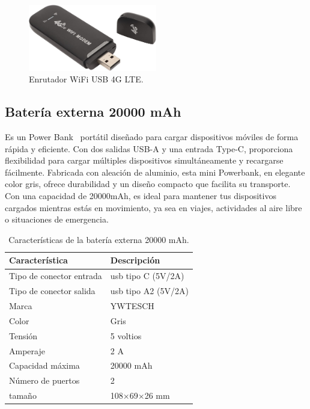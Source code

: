\begin{figure}[h]
    \centering
    \includegraphics[width=0.5\textwidth]{img/herramientas/enrutador_wifi.png}
    \caption{Enrutador WiFi USB 4G LTE.} \label{Img:EnrutadorWifi}
\end{figure}

\subsection{Batería externa 20000 mAh}
Es un Power Bank~\cite{misc:Powerbank} portátil diseñado para cargar dispositivos móviles de forma rápida y eficiente. Con dos salidas USB-A y una entrada Type-C, proporciona flexibilidad para cargar múltiples dispositivos simultáneamente y recargarse fácilmente. Fabricada con aleación de aluminio, esta mini Powerbank, en elegante color gris, ofrece durabilidad y un diseño compacto que facilita su transporte. Con una capacidad de 20000mAh, es ideal para mantener tus dispositivos cargados mientras estás en movimiento, ya sea en viajes, actividades al aire libre o situaciones de emergencia.

\begin{table}[htbp]
\begin{center}
\caption{Características de la batería externa 20000 mAh.}
\begin{tabular}{|l|l|}
\hline
\rowcolor[HTML]{C0C0C0} 
\textbf{Característica} & \textbf{Descripción}\\ \hline
Tipo de conector entrada & usb tipo C (5V/2A)\\ \hline
Tipo de conector salida & usb tipo A2 (5V/2A)\\ \hline
Marca & YWTESCH \\ \hline
Color & Gris \\ \hline
Tensión & 5 voltios \\ \hline
Amperaje & 2 A \\ \hline
Capacidad máxima & 20000 mAh \\ \hline
Número de puertos & 2 \\ \hline
tamaño & 108$\times$69$\times$26 mm \\ \hline
\end{tabular}
\end{center}
\end{table}

